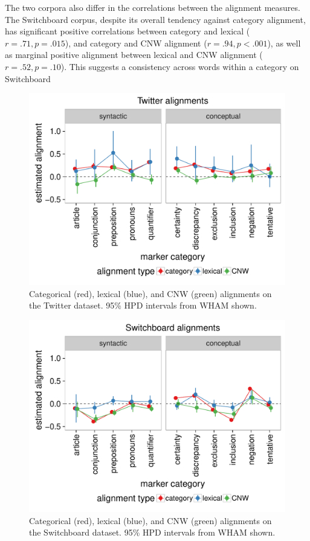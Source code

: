 \documentclass[11pt]{article}
\begin{document}
The two corpora also differ in the correlations between the alignment measures. The Switchboard corpus, despite its overall tendency against category alignment, has significant positive correlations between category and lexical ($r = .71, p=.015$), and category and CNW alignment ($r = .94, p <.001$), as well as marginal positive alignment between lexical and CNW alignment ($r = .52, p = .10$).  This suggests a consistency across words within a category on Switchboard

\begin{figure}[t]
  \begin{center}
    \includegraphics[width=\columnwidth]{results/twitter_line.pdf}
  \end{center}
  \caption{Categorical (red), lexical (blue), and CNW (green) alignments on the Twitter dataset. 95\% HPD intervals from WHAM shown.}\label{fig:twitter-res}
\end{figure}

\begin{figure}[t]
  \begin{center}
    \includegraphics[width=\columnwidth]{results/swbda_line.pdf}
  \end{center}
  \caption{Categorical (red), lexical (blue), and CNW (green) alignments on the Switchboard dataset. 95\% HPD intervals from WHAM shown.}\label{fig:swbda-res}
\end{figure}
\end{document}
